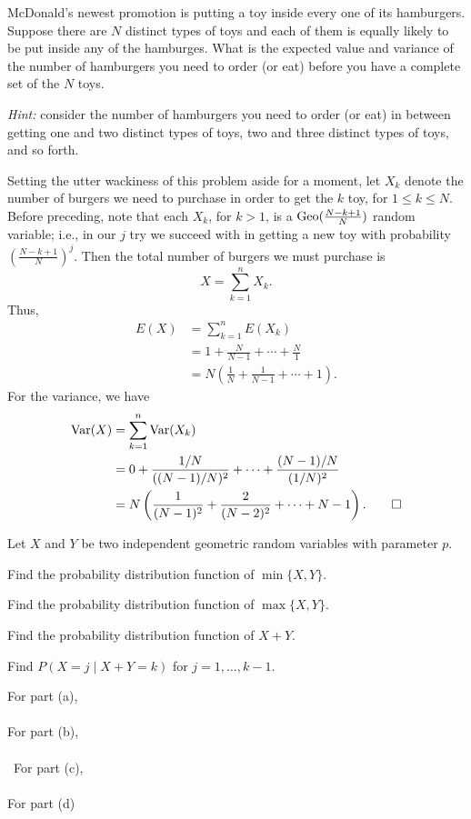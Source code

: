 \begin{problem}
  McDonald's newest promotion is putting a toy inside every one of its
  hamburgers. Suppose there are \(N\) distinct types of toys and each of
  them is equally likely to be put inside any of the hamburges. What is the
  expected value and variance of the number of hamburgers you need to order
  (or eat) before you have a complete set of the \(N\) toys.

  \noindent\emph{Hint:} consider the number of hamburgers you need to order
  (or eat) in between getting one and two distinct types of toys, two and
  three distinct types of toys, and so forth.
\end{problem}
\begin{solution*}
  Setting the utter wackiness of this problem aside for a moment, let
  \(X_k\) denote the number of burgers we need to purchase in order to get
  the \(k\) toy, for \(1\leq k\leq N\). Before preceding, note
  that each \(X_k\), for \(k>1\), is a \(\operatorname{Geo}(\frac{N-k+1}{N})\) random
  variable; i.e., in our \(j\) try we succeed with in getting a
  new toy with probability \((\frac{N-k+1}{N})^j\). Then the total number
  of burgers we must purchase is
  \[
    X=\sum_{k=1}^n X_k.
  \]
  Thus,
  \begin{align*}
    E(X)
    &=\sum_{k=1}^n E(X_k)\\
    &=1+\frac{N}{N-1}+\dotsb+\frac{N}{1}\\
    &=N\left(\frac{1}{N}+\frac{1}{N-1}+\dotsb+1\right).
  \end{align*}
  For the variance, we have
  \begin{align*}
    \operatorname{Var}(X)
    &=\sum_{k=1}^n\operatorname{Var}(X_k)\\
    &=0+\frac{1/N}{((N-1)/N)^2}+\dotsb+\frac{(N-1)/N}{(1/N)^2}\\
    &=N\left(\frac{1}{(N-1)^2}+\frac{2}{(N-2)^2}+\dotsb+N-1\right).\qedhere
  \end{align*}
\end{solution*}

\begin{problem}
  Let \(X\) and \(Y\) be two independent geometric random variables with
  parameter \(p\).
  \begin{alphlist}
  \item Find the probability distribution function of \(\min\{X,Y\}\).
  \item Find the probability distribution function of \(\max\{X,Y\}\).
  \item Find the probability distribution function of \(X+Y\).
  \item Find \(P(X=j\mid X+Y=k)\) for \(j=1,\dotsc,k-1\).
  \end{alphlist}
\end{problem}
\begin{solution*}
  For part (a),
  \\\\
  For part (b),
  \\\\\
  For part (c),
  \\\\
  For part (d)
\end{solution*}

